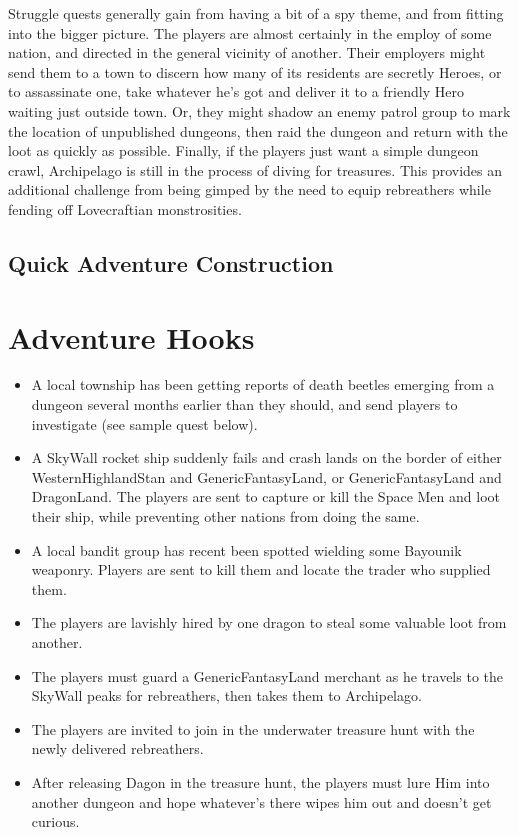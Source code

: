\documentclass[12pt,a4paper,twocolumn]{article}
\begin{document}
\begin{itemize}
Struggle quests generally gain from having a bit of a spy theme, and from fitting into the bigger picture.  The players are almost certainly in the employ of some nation, and directed in the general vicinity of another.  Their employers might send them to a town to discern how many of its residents are secretly Heroes, or to assassinate one, take whatever he's got and deliver it to a friendly Hero waiting just outside town.  Or, they might shadow an enemy patrol group to mark the location of unpublished dungeons, then raid the dungeon and return with the loot as quickly as possible.  Finally, if the players just want a simple dungeon crawl, Archipelago is still in the process of diving for treasures.  This provides an additional challenge from being gimped by the need to equip rebreathers while fending off Lovecraftian monstrosities.  

\end{itemize} 

\subsection{Quick Adventure Construction}

\section{Adventure Hooks}

\begin{itemize}

\item A local township has been getting reports of death beetles emerging from a dungeon several months earlier than they should, and send players to investigate (see sample quest below).

\item A SkyWall rocket ship suddenly fails and crash lands on the border of either WesternHighlandStan and GenericFantasyLand, or GenericFantasyLand and DragonLand.  The players are sent to capture or kill the Space Men and loot their ship, while preventing other nations from doing the same.

\item A local bandit group has recent been spotted wielding some Bayounik weaponry.  Players are sent to kill them and locate the trader who supplied them.

\item The players are lavishly hired by one dragon to steal some valuable loot from another.

\item The players must guard a GenericFantasyLand merchant as he travels to the SkyWall peaks for rebreathers, then takes them to Archipelago.

\item The players are invited to join in the underwater treasure hunt with the newly delivered rebreathers.

\item After releasing Dagon in the treasure hunt, the players must lure Him into another dungeon and hope whatever's there wipes him out and doesn't get curious.

\end{itemize}
\end{document}
